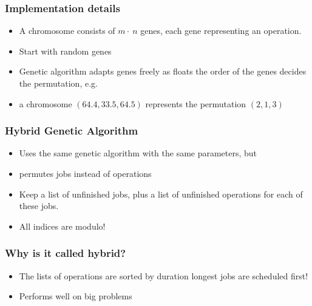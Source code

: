 \begin{frame}
  \frametitle{Implementation details}
\begin{itemize}

	\item A chromosome consists of $m\cdot~n$ genes, each gene representing an operation.

	\item Start with random genes

	\item Genetic algorithm adapts genes freely as floats \textrightarrow the order of the genes decides the permutation, e.g.

	\item a chromosome $(64.4, 33.5, 64.5)$ represents the permutation $(2,1,3)$
\end{itemize}

\end{frame}

\begin{frame}
  \frametitle{Hybrid Genetic Algorithm}
\begin{itemize}

	\item 	Uses the same genetic algorithm with the same parameters, but

	\item  	permutes jobs instead of operations

	\item 	Keep a list of unfinished jobs, plus a list of unfinished operations for each of these jobs.

	\item 	All indices are modulo!
\end{itemize}
 
\end{frame}

\begin{frame}
  \frametitle{Why is it called hybrid?}
\begin{itemize}

	\item 	The lists of operations are sorted by duration \textrightarrow longest jobs are scheduled first!

	\item  	Performs well on big problems
\end{itemize}
 
\end{frame}

